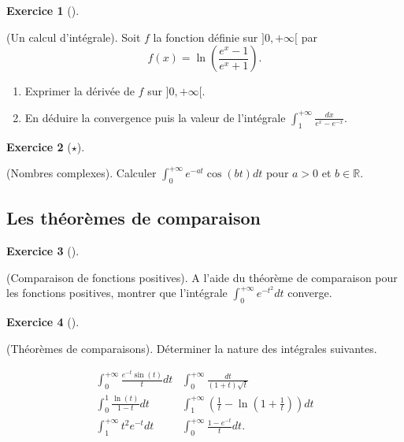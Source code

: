 \documentclass[
  french,
  letterpaper,
  DIV=11,
  numbers=noendperiod]{scrreprt}
\theoremstyle{plain}
\theoremstyle{definition}
\theoremstyle{plain}
\theoremstyle{plain}
\theoremstyle{definition}
\newtheorem{exercise}{Exercice}[chapter]
\theoremstyle{definition}
\theoremstyle{plain}
\theoremstyle{remark}
\begin{document}
\begin{exercise}[]\protect\hypertarget{exr-01-0001}{}\label{exr-01-0001}

(Un calcul d'intégrale). Soit \(f\) la fonction définie sur
\(]0,+\infty[\) par \[f(x)=\ln\left(\frac{e^x-1}{e^x+1}\right).\]

\begin{enumerate}
\def\labelenumi{\arabic{enumi}.}
\item
  Exprimer la dérivée de \(f\) sur \(]0,+\infty[\).
\item
  En déduire la convergence puis la valeur de l'intégrale
  \(\displaystyle\int_1^{+\infty}\frac{dx}{e^x-e^{-x}}\).
\end{enumerate}

\end{exercise}

\begin{exercise}[\(\star\)]\protect\hypertarget{exr-01-0002}{}\label{exr-01-0002}

(Nombres complexes). Calculer
\(\displaystyle\int_0^{+\infty}e^{-at}\cos(bt)dt\) pour \(a>0\) et
\(b\in\mathbb{R}\).

\end{exercise}

\subsection{Les théorèmes de
comparaison}\label{les-thuxe9oruxe8mes-de-comparaison}

\begin{exercise}[]\protect\hypertarget{exr-01-0003}{}\label{exr-01-0003}

(Comparaison de fonctions positives). A l'aide du théorème de
comparaison pour les fonctions positives, montrer que l'intégrale
\(\displaystyle\int_0^{+\infty}e^{-t^2}dt\) converge.

\end{exercise}

\begin{exercise}[]\protect\hypertarget{exr-01-comparaison}{}\label{exr-01-comparaison}

(Théorèmes de comparaisons). Déterminer la nature des intégrales
suivantes.

\[
\begin{array}{ll}
\int_0^{+\infty}\frac{e^{-t}\sin(t)}{t}dt & \int_0^{+\infty}\frac{dt}{(1+t)\sqrt{t}}\\
\int_0^1\frac{\ln(t)}{1-t}dt              & \int_1^{+\infty}\left(\frac{1}{t}-\ln\left(1 + \frac{1}{t}\right)\right)dt\\
\int_1^{+\infty}t^2e^{-t}dt               & \int_{0}^{+\infty}\frac{1-e^{-t}}{t}dt.
\end{array}
\]

\end{exercise}
\end{document}
